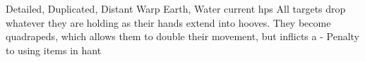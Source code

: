   {Detailed, Duplicated, Distant}%
  {Warp}%
  {Earth, Water}%
  {current \glspl{hp}}%
  {All  targets drop whatever they are holding as their hands extend into hooves.
  They become quadrapeds, which allows them to double their movement, but inflicts a - Penalty to using items in hant}%
  {}
